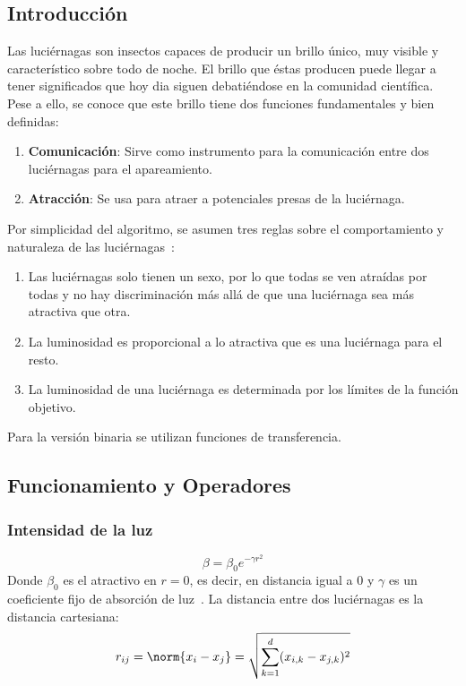 \subsection{Introducción}
Las luciérnagas son insectos capaces de producir un brillo único, muy visible y característico sobre todo de noche. El brillo que éstas producen puede llegar a tener significados que hoy dia siguen debatiéndose en la comunidad científica. Pese a ello, se conoce que este brillo tiene dos funciones fundamentales y bien definidas:
\begin{enumerate}
    \item \textbf{Comunicación}: Sirve como instrumento para la comunicación entre dos luciérnagas para el apareamiento.
    \item \textbf{Atracción}: Se usa para atraer a potenciales presas de la luciérnaga.
\end{enumerate}
Por simplicidad del algoritmo, se asumen tres reglas sobre el comportamiento y naturaleza de las luciérnagas~\cite{yang_chapter_2014}:
\begin{enumerate}
    \item Las luciérnagas solo tienen un sexo, por lo que todas se ven atraídas por todas y no hay discriminación más allá de que una luciérnaga sea más atractiva que otra.
    \item La luminosidad es proporcional a lo atractiva que es una luciérnaga para el resto.
    \item La luminosidad de una luciérnaga es determinada por los límites de la función objetivo.
\end{enumerate}
Para la versión binaria se utilizan funciones de transferencia.

\subsection{Funcionamiento y Operadores}
\subsubsection{Intensidad de la luz}
\begin{equation}
    \beta = \beta_0 e^{-\gamma r^2}
\end{equation}
Donde $\beta_0$ es el atractivo en $r=0$, es decir, en distancia igual a $0$ y $\gamma$ es un coeficiente fijo de absorción de luz~\cite{yang_chapter_2014}. La distancia entre dos luciérnagas es la distancia cartesiana:
\begin{equation}
    r_{ij}=\norm{x_i-x_j}=\sqrt{\sum_{k=1}^d(x_{i,k}-x_{j,k})^2}
\end{equation}


